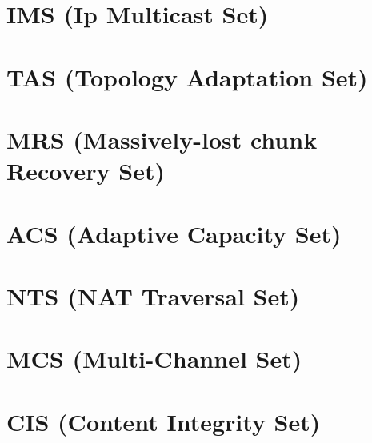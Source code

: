 \section{IMS (Ip Multicast Set)}


\section{TAS (Topology Adaptation Set)}


\section{MRS (Massively-lost chunk Recovery Set)}


\section{ACS (Adaptive Capacity Set)}


\section{NTS (NAT Traversal Set)}


\section{MCS (Multi-Channel Set)}


\section{CIS (Content Integrity Set)}


%

\printglossary[type=\acronymtype]

\printglossary


